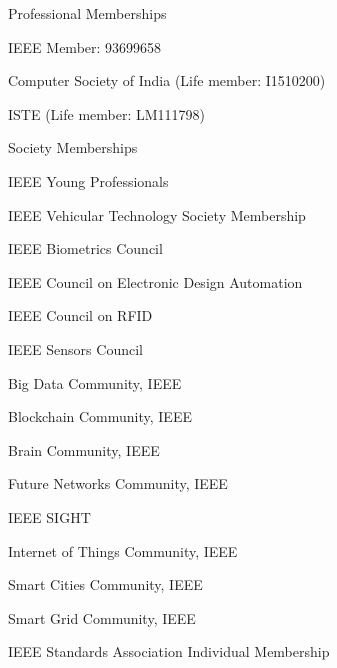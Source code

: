 \begin{cventries}
  \cventry
    {}
    {Professional Memberships}
    {}
    {}
    {
      \begin{cvitems}
        \item {IEEE Member: 93699658}
        \item {Computer Society of India (Life member: I1510200)}
        \item {ISTE (Life member: LM111798)}
     \end{cvitems}
    }
 \end{cventries} 



\begin{cventries}
  \cventry
    {}
    {Society Memberships}
    {}
    {}
    {
      \begin{cvitems}
      {
        \item {IEEE Young Professionals}
        \item {IEEE Vehicular Technology Society Membership}
        \item {IEEE Biometrics Council}
        \item{IEEE Council on Electronic Design Automation }
        \item{IEEE Council on RFID}
        \item{IEEE Sensors Council}
        \item{Big Data Community, IEEE}
        \item{Blockchain Community, IEEE}
        \item{Brain Community, IEEE}
        \item{Future Networks Community, IEEE }
        \item{IEEE SIGHT }
        \item{Internet of Things Community, IEEE }
        \item{Smart Cities Community, IEEE}
        \item{Smart Grid Community, IEEE}
        \item{IEEE Standards Association Individual Membership}
    }
     \end{cvitems}
    }
 \end{cventries} 
